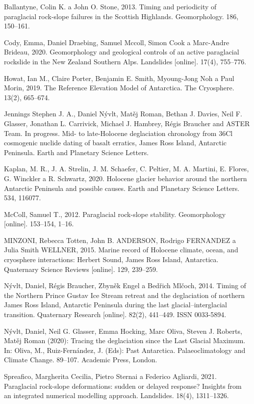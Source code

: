 {Ballantyne, Colin K. a John O. Stone, 2013. Timing and periodicity of paraglacial rock-slope failures in the Scottish Highlands. Geomorphology. 186, 150–161. 

Cody, Emma, Daniel Draebing, Samuel Mccoll, Simon Cook a Marc-Andre Brideau, 2020. Geomorphology and geological controls of an active paraglacial rockslide in the New Zealand Southern Alps. Landslides [online]. 17(4), 755–776. 

Howat, Ian M., Claire Porter, Benjamin E. Smith, Myoung-Jong Noh a Paul Morin, 2019. The Reference Elevation Model of Antarctica. The Cryosphere. 13(2), 665–674. 

Jennings Stephen J. A., Daniel Nývlt, Matěj Roman, Bethan J. Davies, Neil F. Glasser, Jonathan L. Carrivick, Michael J. Hambrey, Régis Braucher and ASTER Team. In progress. Mid- to late-Holocene deglaciation chronology from 36Cl cosmogenic nuclide dating of basalt erratics, James Ross Island, Antarctic Peninsula. Earth and Planetary Science Letters.

Kaplan, M. R., J. A. Strelin, J. M. Schaefer, C. Peltier, M. A. Martini, E. Flores, G. Winckler a R. Schwartz, 2020. Holocene glacier behavior around the northern Antarctic Peninsula and possible causes. Earth and Planetary Science Letters. 534, 116077.  

McColl, Samuel T., 2012. Paraglacial rock-slope stability. Geomorphology [online]. 153–154, 1–16. 

MINZONI, Rebecca Totten, John B. ANDERSON, Rodrigo FERNANDEZ a Julia Smith WELLNER, 2015. Marine record of Holocene climate, ocean, and cryosphere interactions: Herbert Sound, James Ross Island, Antarctica. Quaternary Science Reviews [online]. 129, 239–259. 

Nývlt, Daniel, Régis Braucher, Zbyněk Engel a Bedřich Mlčoch, 2014. Timing of the Northern Prince Gustav Ice Stream retreat and the deglaciation of northern James Ross Island, Antarctic Peninsula during the last glacial–interglacial transition. Quaternary Research [online]. 82(2), 441–449. ISSN 0033-5894. 

Nývlt, Daniel, Neil G. Glasser, Emma Hocking, Marc Oliva, Steven J. Roberts, Matěj Roman (2020): Tracing the deglaciation since the Last Glacial Maximum. In: Oliva, M., Ruiz-Fernández, J. (Eds): Past Antarctica. Palaeoclimatology and Climate Change. 89–107. Academic Press, London.

Spreafico, Margherita Cecilia, Pietro Sternai a Federico Agliardi, 2021. Paraglacial rock-slope deformations: sudden or delayed response? Insights from an integrated numerical modelling approach. Landslides. 18(4), 1311–1326. 
}

